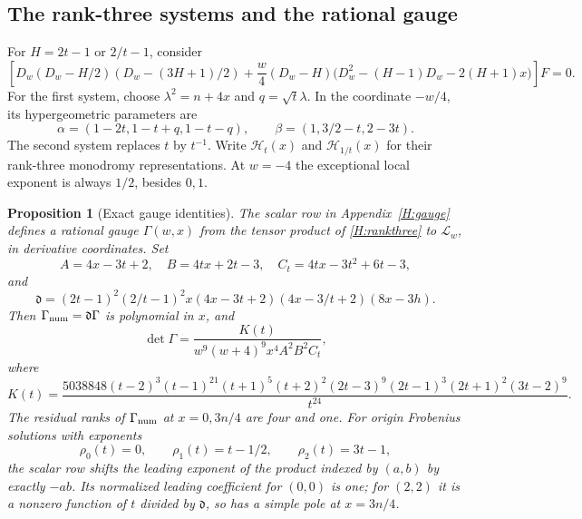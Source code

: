 \documentclass[11pt]{article}
\newtheorem{proposition}[theorem]{Proposition}
\numberwithin{equation}{section}
\begin{document}
\subsection{The rank-three systems and the rational gauge}
For $H=2t-1$ or $2/t-1$, consider
\begin{equation}\label{H:rankthree}
\left[D_w(D_w-H/2)(D_w-(3H+1)/2)
+\frac w4(D_w-H)\bigl(D_w^2-(H-1)D_w-2(H+1)x\bigr)\right]F=0.
\end{equation}
For the first system, choose $\lambda^2=n+4x$ and $q=\sqrt t\lambda$. In the coordinate $-w/4$, its hypergeometric parameters are
\begin{equation}\label{H:parameters}
\alpha=(1-2t,1-t+q,1-t-q),\qquad
\beta=(1,3/2-t,2-3t).
\end{equation}
The second system replaces $t$ by $t^{-1}$. Write $\mathcal H_t(x)$ and $\mathcal H_{1/t}(x)$ for their rank-three monodromy representations. At $w=-4$ the exceptional local exponent is always $1/2$, besides $0,1$.

\begin{proposition}[Exact gauge identities]\label{H:gaugeclaim}
The scalar row in Appendix~\ref{H:gauge} defines a rational gauge $\Gamma(w,x)$ from the tensor product of \eqref{H:rankthree} to $\mathcal L_w$, in derivative coordinates. Set
\[
A=4x-3t+2,\quad B=4tx+2t-3,\quad C_t=4tx-3t^2+6t-3,
\]
and
\[
\mathfrak d=(2t-1)^2(2/t-1)^2x(4x-3t+2)(4x-3/t+2)(8x-3h).
\]
Then $\Gamma_{\rm num}=\mathfrak d\Gamma$ is polynomial in $x$, and
\begin{equation}\label{H:det}
\det\Gamma=\frac{K(t)}{w^9(w+4)^9x^4A^2B^2C_t},
\end{equation}
where
\[
K(t)=\frac{5038848(t-2)^3(t-1)^{21}(t+1)^5(t+2)^2
(2t-3)^9(2t-1)^3(2t+1)^2(3t-2)^9}{t^{24}}.
\]
The residual ranks of $\Gamma_{\rm num}$ at $x=0,3n/4$ are four and one. For origin Frobenius solutions with exponents
\[
\rho_0(t)=0,\qquad\rho_1(t)=t-1/2,\qquad\rho_2(t)=3t-1,
\]
the scalar row shifts the leading exponent of the product indexed by $(a,b)$ by exactly $-ab$. Its normalized leading coefficient for $(0,0)$ is one; for $(2,2)$ it is a nonzero function of $t$ divided by $\mathfrak d$, so has a simple pole at $x=3n/4$.
\end{proposition}
\end{document}
